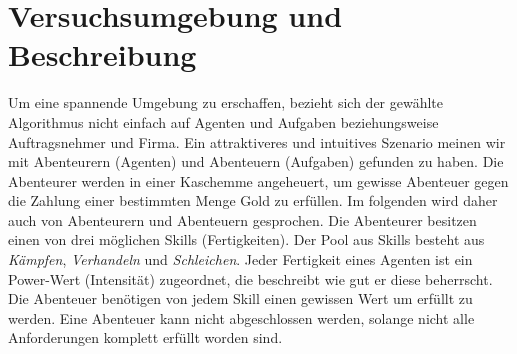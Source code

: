 \documentclass[fleqn,10pt]{SelfArx} %
\begin{document}

\section{Versuchsumgebung und Beschreibung}
\label{sec:Umgebung}

Um eine spannende Umgebung zu erschaffen, bezieht sich der gewählte Algorithmus nicht einfach auf Agenten und Aufgaben beziehungsweise Auftragsnehmer und Firma. Ein attraktiveres und intuitives Szenario meinen wir mit Abenteurern (Agenten) und Abenteuern (Aufgaben) gefunden zu haben. Die Abenteurer werden in einer Kaschemme angeheuert, um gewisse Abenteuer gegen die Zahlung einer bestimmten Menge Gold zu erfüllen. Im folgenden wird daher auch von Abenteurern und Abenteuern gesprochen. Die Abenteurer besitzen einen von drei möglichen Skills (Fertigkeiten). Der Pool aus Skills besteht aus \textit{Kämpfen}, \textit{Verhandeln} und \textit{Schleichen}. Jeder Fertigkeit eines Agenten ist ein Power-Wert (Intensität) zugeordnet, die beschreibt wie gut er diese beherrscht. Die Abenteuer benötigen von jedem Skill einen gewissen Wert um erfüllt zu werden. Eine Abenteuer kann nicht abgeschlossen werden, solange nicht alle Anforderungen komplett erfüllt worden sind.\\
\end{document}
